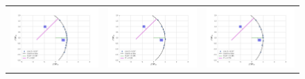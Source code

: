 \begin{figure}
\begin{tabular}{@{}c@{}c@{}c@{}}
\includegraphics[clip]{./Programs/LV-bowshocks-xyfancy-positionswill-LV4} & \includegraphics[clip]{./Programs/Multi-Fit/samp00/LV-bowshocks-xyfancy-positionssamp00-LV4} & \includegraphics[clip]{./Programs/Multi-Fit/samp01/LV-bowshocks-xyfancy-positionssamp01-LV4} \\

\end{tabular}
\end{figure}
